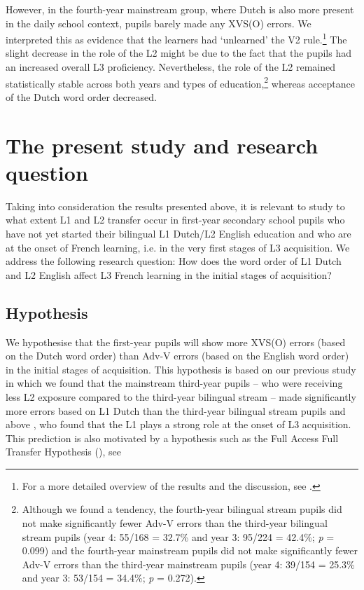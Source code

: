 \documentclass[output=paper,modfonts,nonflat, newtxmath]{langsci/langscibook}
\begin{document}
  However, in the fourth-year mainstream group, where Dutch is also more present in the daily school context, pupils barely made any XVS(O) errors. We interpreted this as evidence that the learners had ‘unlearned’ the V2 rule.\footnote{ \textrm{For a more detailed overview of the results and the discussion, see \citet{StadtEtAl2016, StadtEtAl2018Exposure}.}} The slight decrease in the role of the L2 might be due to the fact that the pupils had an increased overall L3 proficiency. Nevertheless, the role of the L2 remained statistically stable across both years and types of education,\footnote{ \textrm{Although we found a tendency, the} \textrm{fourth-year} \textrm{bilingual stream pupils did not make significantly fewer Adv-V errors than the third-year bilingual stream pupils (year 4: 55/168 = 32.7\% and year 3: 95/224 = 42.4\%;} \textrm{\textit{p} }\textrm{= 0.099) and the fourth-year mainstream pupils did not make significantly fewer Adv-V errors than the third-year mainstream pupils (year 4: 39/154 = 25.3\% and year 3: 53/154 = 34.4\%;} \textrm{\textit{p} }\textrm{= 0.272).}} whereas acceptance of the Dutch word order decreased.

\section{{The} {present} {study} {and} {research} {question}}%
\label{sec:stadt:3}

Taking into consideration the results presented above, it is relevant to study to what extent L1 and L2 transfer occur in first-year secondary school pupils who have not yet started their bilingual L1 Dutch/L2 English education and who are at the onset of French learning, i.e. in the very first stages of L3 acquisition. We address the following research question: How does the word order of L1 Dutch and L2 English affect L3 French learning in the initial stages of acquisition?

\subsection{{Hypothesis} }%
\label{sec:stadt:3.1}

We hypothesise that the first-year pupils will show more XVS(O) errors (based on the Dutch word order) than Adv-V errors (based on the English word order) in the initial stages of acquisition. This hypothesis is based on our previous study \citep{StadtEtAl2016} in which we found that the mainstream third-year pupils – who were receiving less L2 exposure compared to the third-year bilingual stream – made significantly more errors based on L1 Dutch than the third-year bilingual stream pupils and above \citep{Hermas2010, Hermas2014Morphosyntax, Hermas2014Relatives}, who found that the L1 plays a strong role at the onset of L3 acquisition. This prediction is also motivated by a hypothesis such as the Full Access Full Transfer Hypothesis (\citealt{SchwartzSprouse1996}), see 
\end{document}
